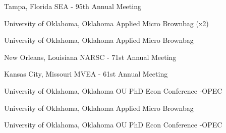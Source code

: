 {%
	Tampa, Florida}
{%
	SEA - 95th Annual Meeting}
{}

{%
	University of Oklahoma, Oklahoma}
{%
	Applied Micro Brownbag (x2)}
{}

{%
	University of Oklahoma, Oklahoma}
{%
	Applied Micro Brownbag}
{}

{%
	New Orleans, Louisiana}
{%
	NARSC - 71st Annual Meeting}
{}

{%
	Kansas City, Missouri}
{%
	MVEA - 61st Annual Meeting}
{}


{%
	University of Oklahoma, Oklahoma}
{%
	OU PhD Econ Conference -OPEC}
{}

{%
	University of Oklahoma, Oklahoma}
{%
	Applied Micro Brownbag}
{}

{%
	University of Oklahoma, Oklahoma}
{%
	OU PhD Econ Conference -OPEC}
{}